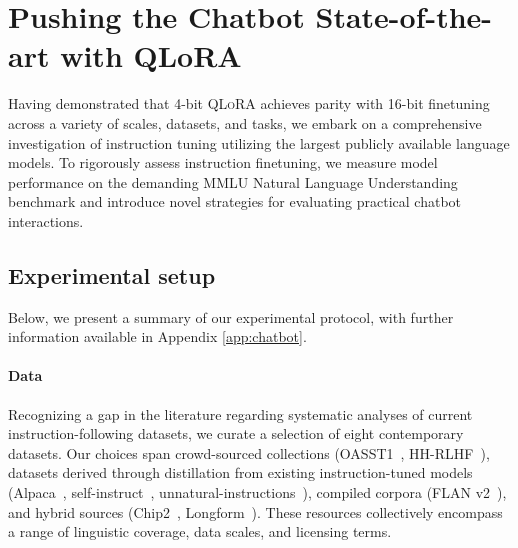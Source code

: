 \section{Pushing the Chatbot State-of-the-art with QLoRA}
\label{sec:pushing}
Having demonstrated that 4-bit \textsc{QLoRA} achieves parity with 16-bit finetuning across a variety of scales, datasets, and tasks, we embark on a comprehensive investigation of instruction tuning utilizing the largest publicly available language models. To rigorously assess instruction finetuning, we measure model performance on the demanding MMLU Natural Language Understanding benchmark and introduce novel strategies for evaluating practical chatbot interactions.

\subsection{Experimental setup}
Below, we present a summary of our experimental protocol, with further information available in Appendix \ref{app:chatbot}.

\paragraph{Data} Recognizing a gap in the literature regarding systematic analyses of current instruction-following datasets, we curate a selection of eight contemporary datasets. Our choices span crowd-sourced collections (OASST1~\citep{kopf2023openassistant}, HH-RLHF~\citep{bai2022training}), datasets derived through distillation from existing instruction-tuned models (Alpaca~\citep{alpaca}, self-instruct~\citep{wang2022self}, unnatural-instructions~\citep{honovich2022unnatural}), compiled corpora (FLAN v2~\citep{chung2022scaling}), and hybrid sources (Chip2~\citep{laion2023}, Longform~\citep{koksal2023longform}). These resources collectively encompass a range of linguistic coverage, data scales, and licensing terms.

